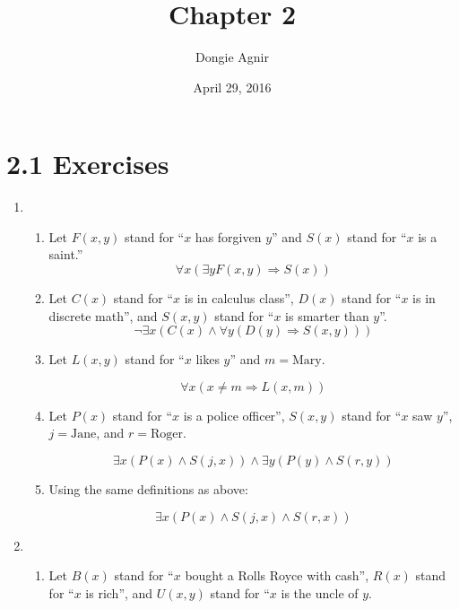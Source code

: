 \documentclass{article}
\title{Chapter 2}
\author{Dongie Agnir}
\date{April 29, 2016}
\begin{document}
\maketitle

\section*{2.1 Exercises}
\begin{enumerate}
\item
	\begin{enumerate}
	\item Let $F(x,y)$ stand for ``$x$ has forgiven $y$'' and $S(x)$ stand for ``$x$ is a saint.''
		\begin{equation*}
			\forall x (\exists y F(x,y) \Rightarrow S(x))
			\end{equation*}

	\item Let $C(x)$ stand for ``$x$ is in calculus class'', $D(x)$ stand for ``$x$ is in discrete math'', and $S(x,y)$ stand for ``$x$ is smarter than $y$''.
		\begin{equation*}
			\lnot \exists x (C(x) \land \forall y (D(y) \Rightarrow S(x,y)))
		\end{equation*}
	\item Let $L(x,y)$ stand for ``$x$ likes $y$'' and $m = \text{Mary}$.

		\begin{equation*}
			\forall x (x \neq m \Rightarrow L(x,m))
		\end{equation*}
	\item Let $P(x)$ stand for ``$x$ is a police officer'', $S(x,y)$ stand for ``$x$ saw $y$'', $j = \text{Jane}$, and $r = \text{Roger}$.

		\begin{equation*}
			\exists x (P(x) \land S(j,x)) \land \exists y (P(y) \land S(r,y))
		\end{equation*}
	\item Using the same definitions as above:

		\begin{equation*}
			\exists x (P(x) \land S(j,x) \land S(r,x))
		\end{equation*}
	\end{enumerate}
\item
	\begin{enumerate}
	\item Let $B(x)$ stand for ``$x$ bought a Rolls Royce with cash'', $R(x)$ stand for ``$x$ is rich'', and $U(x,y)$ stand for ``$x$ is the uncle of $y$.


\end{enumerate}
\end{enumerate}
\end{document}
